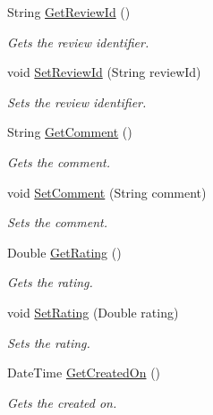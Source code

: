 \begin{DoxyCompactItemize}
String \hyperlink{classcom_1_1shephertz_1_1app42_1_1paas_1_1sdk_1_1csharp_1_1review_1_1_review_aaca32f380efca3c1b4de01f6cdc3d86a}{Get\+Review\+Id} ()
\begin{DoxyCompactList}\small\item\em Gets the review identifier. \end{DoxyCompactList}\item 
void \hyperlink{classcom_1_1shephertz_1_1app42_1_1paas_1_1sdk_1_1csharp_1_1review_1_1_review_ae735010a55837d6664c79fb440bbf3b0}{Set\+Review\+Id} (String review\+Id)
\begin{DoxyCompactList}\small\item\em Sets the review identifier. \end{DoxyCompactList}\item 
String \hyperlink{classcom_1_1shephertz_1_1app42_1_1paas_1_1sdk_1_1csharp_1_1review_1_1_review_ae5a75bd7a3694b2ea7c5ed08c2f059e9}{Get\+Comment} ()
\begin{DoxyCompactList}\small\item\em Gets the comment. \end{DoxyCompactList}\item 
void \hyperlink{classcom_1_1shephertz_1_1app42_1_1paas_1_1sdk_1_1csharp_1_1review_1_1_review_ab4b131a704641c672f977d66d93c9ac3}{Set\+Comment} (String comment)
\begin{DoxyCompactList}\small\item\em Sets the comment. \end{DoxyCompactList}\item 
Double \hyperlink{classcom_1_1shephertz_1_1app42_1_1paas_1_1sdk_1_1csharp_1_1review_1_1_review_aa2e42d08bf6b2e6549934bdcf33c5562}{Get\+Rating} ()
\begin{DoxyCompactList}\small\item\em Gets the rating. \end{DoxyCompactList}\item 
void \hyperlink{classcom_1_1shephertz_1_1app42_1_1paas_1_1sdk_1_1csharp_1_1review_1_1_review_ad72ff97a60f513b1e1befcd85d8d87cf}{Set\+Rating} (Double rating)
\begin{DoxyCompactList}\small\item\em Sets the rating. \end{DoxyCompactList}\item 
Date\+Time \hyperlink{classcom_1_1shephertz_1_1app42_1_1paas_1_1sdk_1_1csharp_1_1review_1_1_review_af2011c0d6db8f96d9f8b04f9d9787c4e}{Get\+Created\+On} ()
\begin{DoxyCompactList}\small\item\em Gets the created on. \end{DoxyCompactList}\item 

\end{DoxyCompactItemize}
